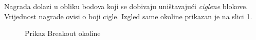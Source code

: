 Nagrada dolazi u obliku bodova koji se dobivaju uništavajući \textit{ciglene} blokove. Vrijednost nagrade ovisi o boji cigle. Izgled same okoline prikazan je na slici \ref{fig:breakout}.

\begin{figure}[H]
    \centering
    \caption{Prikaz Breakout okoline}
    \label{fig:breakout}
\end{figure}





